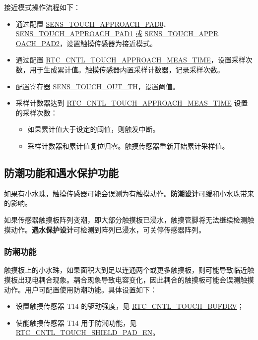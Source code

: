 \documentclass[main\_\_CN.tex]{subfiles}
\begin{document}
接近模式操作流程如下：

\begin{itemize}
    \item 通过配置 \hyperref[fielddesc:SENSTOUCHAPPROACHPAD0]{SENS\_TOUCH\_APPROACH\_PAD0}、\hyperref[fielddesc:SENSTOUCHAPPROACHPAD1]{SENS\_TOUCH\_APPROACH\_PAD1} 或 \hyperref[fielddesc:SENSTOUCHAPPROACHPAD2]{SENS\_TOUCH\_APPR\\OACH\_PAD2}，设置触摸传感器为接近模式。
    \item 通过配置 \hyperref[fielddesc:RTCCNTLTOUCHAPPROACHMEASTIME]{RTC\_CNTL\_TOUCH\_APPROACH\_MEAS\_TIME}，设置采样次数，用于生成累计值。触摸传感器内置采样计数器，记录采样次数。
    \item 配置寄存器 \hyperref[fielddesc:SENSTOUCHOUTTH1]{SENS\_TOUCH\_OUT\_TH}，设置阈值。
    \item 采样计数器达到 \hyperref[fielddesc:RTCCNTLTOUCHAPPROACHMEASTIME]{RTC\_CNTL\_TOUCH\_APPROACH\_MEAS\_TIME} 设置的采样次数：
    \begin{itemize}
        \item 如果累计值大于设定的阈值，则触发中断。
        \item 采样计数器和累计值复位归零。触摸传感器重新开始累计采样值。
    \end{itemize}
\end{itemize}


\subsection{防潮功能和遇水保护功能}

如果有小水珠，触摸传感器可能会误测为有触摸动作。\textbf{防潮设计}可缓和小水珠带来的影响。

如果传感器触摸板阵列变潮，即大部分触摸板已浸水，触摸管脚将无法继续检测触摸动作。\textbf{遇水保护设计}可检测到阵列已浸水，可关停传感器阵列。


\subsubsection{防潮功能}

触摸板上的小水珠，如果面积大到足以连通两个或更多触摸板，则可能导致临近触摸板出现电耦合现象。耦合现象导致电容变化，因此耦合的触摸板可能会误测触摸动作。用户可配置使用防潮功能。具体设置如下：


\begin{itemize}
    \item 设置触摸传感器 T14 的驱动强度，见 \hyperref[fielddesc:RTCCNTLTOUCHBUFDRV]{RTC\_CNTL\_TOUCH\_BUFDRV}；
    \item 使能触摸传感器 T14 用于防潮功能，见 \hyperref[fielddesc:RTCCNTLTOUCHSHIELDPADEN]{RTC\_CNTL\_TOUCH\_SHIELD\_PAD\_EN}。
\end{itemize}
\end{document}
